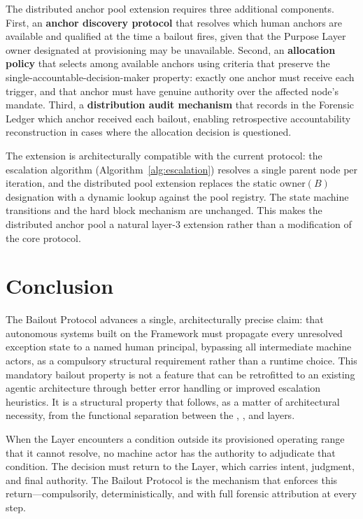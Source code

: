 The distributed anchor pool extension requires three additional components. First, an \textbf{anchor discovery protocol} that resolves which human anchors are available and qualified at the time a bailout fires, given that the Purpose Layer owner designated at provisioning may be unavailable. Second, an \textbf{allocation policy} that selects among available anchors using criteria that preserve the single-accountable-decision-maker property: exactly one anchor must receive each trigger, and that anchor must have genuine authority over the affected node's mandate. Third, a \textbf{distribution audit mechanism} that records in the Forensic Ledger which anchor received each bailout, enabling retrospective accountability reconstruction in cases where the allocation decision is questioned.

The extension is architecturally compatible with the current protocol: the escalation algorithm (Algorithm~\ref{alg:escalation}) resolves a single parent node per iteration, and the distributed pool extension replaces the static $\text{owner}(B)$ designation with a dynamic lookup against the pool registry. The state machine transitions and the hard block mechanism are unchanged. This makes the distributed anchor pool a natural layer-3 extension rather than a modification of the core protocol.

\section{Conclusion}
\label{sec:conclusion}

The Bailout Protocol advances a single, architecturally precise claim: that autonomous systems built on the \bxthree{} Framework must propagate every unresolved exception state to a named human principal, bypassing all intermediate machine actors, as a compulsory structural requirement rather than a runtime choice. This mandatory bailout property is not a feature that can be retrofitted to an existing agentic architecture through better error handling or improved escalation heuristics. It is a structural property that follows, as a matter of architectural necessity, from the functional separation between the \purpose{}, \bounds{}, and \fact{} layers.

When the \bounds{} Layer encounters a condition outside its provisioned operating range that it cannot resolve, no machine actor has the authority to adjudicate that condition. The decision must return to the \purpose{} Layer, which carries intent, judgment, and final authority. The Bailout Protocol is the mechanism that enforces this return---compulsorily, deterministically, and with full forensic attribution at every step.

